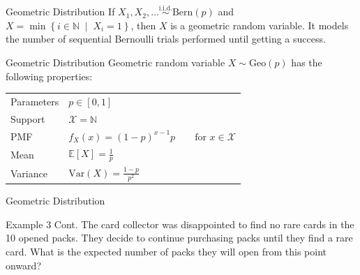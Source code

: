 \documentclass[10pt]{beamer}
\begin{document}
\begin{frame}[fragile]{Geometric Distribution}
If \(X_1, X_2, \dots \overset{\textrm{i.i.d.}}{\sim} \textrm{Bern}\left(p\right)\) and \(X = \min\left\{i \in \mathbb{N} \;\middle|\; X_i = 1\right\}\), then \(X\) is a geometric random variable. It models the number of sequential Bernoulli trials performed until getting a success.

\begin{alertblock}{Geometric Distribution}
Geometric random variable \(X \sim \textrm{Geo}\left(p\right)\) has the following properties:
  \begin{table}
    \begin{tabular}{ll}
      \toprule
      Parameters & \(p \in \left[0,1\right]\)\\
      Support & \(\mathcal{X} = \mathbb{N}\)\\
      PMF & \(f_X\left(x\right) = \left(1 - p\right)^{x - 1}p\qquad\textrm{for }x \in \mathcal{X}\)\\
      Mean & \(\mathbb{E}\left[X\right] = \frac{1}{p}\)\\
      Variance & \(\textrm{Var}\left(X\right) = \frac{1 - p}{p^2}\)\\
      \bottomrule
    \end{tabular}
  \end{table}
\end{alertblock}
\end{frame}

\begin{frame}[fragile]{Geometric Distribution}
\begin{exampleblock}{Example 3 Cont.}
The card collector was disappointed to find no rare cards in the 10 opened packs. They decide to continue purchasing packs until they find a rare card. What is the expected number of packs they will open from this point onward?
\end{exampleblock}
\end{frame}
\end{document}
